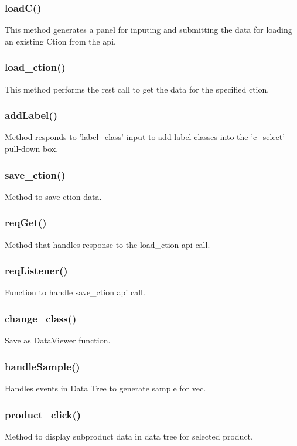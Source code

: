 \documentclass{article}
\begin{document}
\subsubsection{loadC()}
This method generates a panel for inputing and submitting the data
for loading an existing Ction from the api.

\subsubsection{load_ction()}
This method performs the rest call to get the data for the
specified ction.

\subsubsection{addLabel()}
Method responds to 'label_class' input to add label classes
into the 'c_select' pull-down box.

\subsubsection{save_ction()}
Method to save ction data.

\subsubsection{reqGet()}
Method that handles response to the load_ction api call.

\subsubsection{reqListener()}
Function to handle save_ction api call.

\subsubsection{change_class()}
Save as DataViewer function.

\subsubsection{handleSample()}
Handles events in Data Tree to generate sample
for vec.

\subsubsection{product_click()}
Method to display subproduct data in data tree for selected
product.
\end{document}
